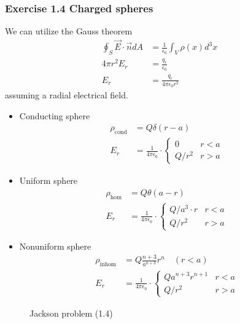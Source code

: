 \documentclass[10pt,a4paper]{article}
\theoremstyle{definition}
\begin{document}
\subsubsection{Exercise 1.4 Charged spheres}
We can utilize the Gauss theorem
\begin{align}
\oint_S\vec{E}\cdot\vec{n}dA&=\frac{1}{\epsilon_0}\int_V\rho(x)d^3x\\
4\pi r^2E_r&=\frac{q_r}{\epsilon_0}\\
E_r&=\frac{q_r}{4\pi\epsilon_0r^2}
\end{align}
assuming a radial electrical field.
\begin{itemize}
\item Conducting sphere
\begin{align}
\rho_\text{cond}&=Q\delta(r-a)\\
E_r&=\frac{1}{4\pi\epsilon_0}\cdot\left\{
\begin{array}{ll}
0 & r<a\\
Q/r^2 & r>a
\end{array}
\right.
\end{align}

\item Uniform sphere
\begin{align}
\rho_\text{hom}&=Q\theta(a-r)\\
E_r&=\frac{1}{4\pi\epsilon_0}\cdot\left\{
\begin{array}{ll}
Q/a^3\cdot r & r<a\\
Q/r^2 & r>a
\end{array}
\right.
\end{align}

\item Nonuniform sphere
\begin{align}
\rho_\text{inhom}&=Q\frac{n+3}{a^{n+3}}r^n\quad(r<a)\\
E_r&=\frac{1}{4\pi\epsilon_0}\cdot\left\{
\begin{array}{ll}
Qa^{n+3}r^{n+1} & r<a\\
Q/r^2 & r>a
\end{array}
\right.
\end{align}
\end{itemize}
\begin{figure}[!h]
\centering
{}
\caption{Jackson problem (1.4)}
\end{figure}
\end{document}
